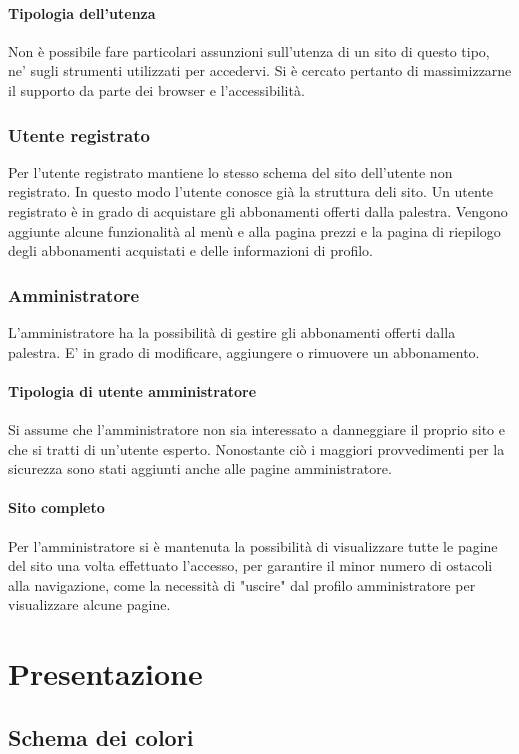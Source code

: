 \documentclass[12pt,a4paper]{article}
\begin{document}
\paragraph{Tipologia dell'utenza}Non è possibile fare particolari assunzioni sull'utenza di un sito di questo tipo, ne' sugli strumenti utilizzati per accedervi. Si è cercato pertanto di massimizzarne il supporto da parte dei browser e l'accessibilità.
\subsubsection{Utente registrato} Per l'utente registrato mantiene lo stesso schema del sito dell'utente non registrato. In questo modo l'utente conosce già la struttura deli sito. Un utente registrato è in grado di acquistare gli abbonamenti offerti dalla palestra.
Vengono aggiunte alcune funzionalità al menù e alla pagina prezzi e la pagina di riepilogo degli abbonamenti acquistati e delle informazioni di profilo.
\subsubsection{Amministratore} L'amministratore ha la possibilità di gestire gli abbonamenti offerti dalla palestra. E' in grado di modificare, aggiungere o rimuovere un abbonamento. 
\paragraph{Tipologia di utente amministratore}Si assume che l'amministratore non sia interessato a danneggiare il proprio sito e che si tratti di un'utente esperto. Nonostante ciò i maggiori provvedimenti per la sicurezza sono stati aggiunti anche alle pagine amministratore.
\paragraph{Sito completo} Per l'amministratore si è mantenuta la possibilità di visualizzare tutte le pagine del sito una volta effettuato l'accesso, per garantire il minor numero di ostacoli alla navigazione, come la necessità di "uscire" dal profilo amministratore per visualizzare alcune pagine.

\section{Presentazione}
\subsection{Schema dei colori}
\end{document}
